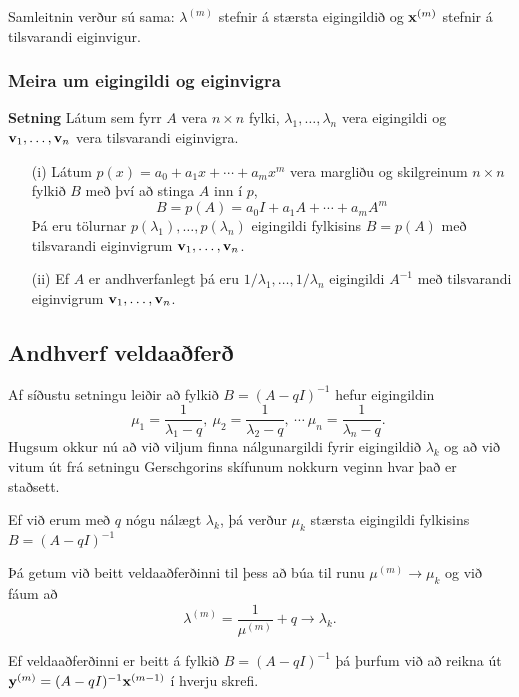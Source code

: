 \documentclass[icelandic,a4paper,12pt]{article}
\begin{document}
\pause
Samleitnin verður sú sama:  $\lambda^{(m)}$ stefnir á stærsta
eigingildið og $\mbox{${\bf x}$}^{(m)}$ stefnir á tilsvarandi eiginvigur.


\subsubsection{Meira um eigingildi og eiginvigra} 
\textbf{Setning} 
Látum sem fyrr $A$ vera $n\times n$ fylki, $\lambda_1,\dots,\lambda_n$
vera eigingildi og $\mbox{${\bf v}$}_1,\dots,\mbox{${\bf v}$}_n$ vera  tilsvarandi eiginvigra.
\begin{enumerate}
\item [(i)] Látum 
$p(x)=a_0+a_1x+\cdots+a_mx^m$ vera margliðu og skilgreinum $n\times n$
fylkið $B$ með því að stinga $A$ inn í $p$,
$$
B=p(A)=a_0I+a_1A+\cdots+a_mA^m
$$
Þá eru tölurnar $p(\lambda_1),\dots,p(\lambda_n)$ eigingildi fylkisins
$B=p(A)$ með tilsvarandi eiginvigrum $\mbox{${\bf v}$}_1,\dots,\mbox{${\bf v}$}_n$.
\item [(ii)] Ef $A$ er andhverfanlegt þá eru
$1/\lambda_1,\dots,1/\lambda_n$ eigingildi $A^{-1}$ 
með tilsvarandi eiginvigrum $\mbox{${\bf v}$}_1,\dots,\mbox{${\bf v}$}_n$.
\end{enumerate}



\subsection{Andhverf veldaaðferð} 
Af síðustu setningu leiðir að fylkið $B=(A-qI)^{-1}$ hefur eigingildin
$$
\mu_1=\dfrac 1{\lambda_1-q},\ 
\mu_2=\dfrac 1{\lambda_2-q},\ \cdots \  
\mu_n=\dfrac 1{\lambda_n-q}.\ 
$$
Hugsum okkur nú að við viljum finna nálgunargildi fyrir 
eigingildið $\lambda_k$ og að við vitum út frá setningu Gerschgorins 
skífunum nokkurn veginn hvar það er staðsett.  

\pause
\smallskip
Ef við erum með $q$
nógu nálægt $\lambda_k$, þá verður $\mu_k$ stærsta eigingildi
fylkisins $B=(A-qI)^{-1}$

\pause
\smallskip
Þá getum við beitt veldaaðferðinni til þess að búa til runu 
$\mu^{(m)}\to \mu_k$ og við fáum að
$$
\lambda^{(m)}=\dfrac 1{\mu^{(m)}}+q\to \lambda_k. 
$$


Ef veldaaðferðinni er beitt á fylkið $B=(A-qI)^{-1}$ þá þurfum við að 
reikna út $\mbox{${\bf y}$}^{(m)}=(A-qI)^{-1}\mbox{${\bf x}$}^{(m-1)}$ í hverju skrefi.
\end{document}
